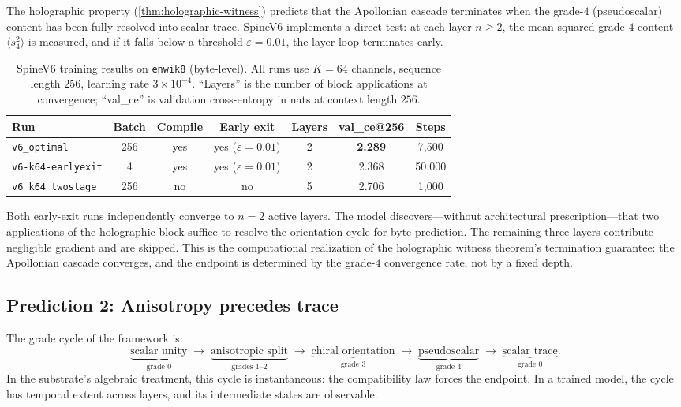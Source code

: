 \documentclass[11pt,a4paper]{article}
\theoremstyle{plain}
\theoremstyle{definition}
\theoremstyle{remark}
\numberwithin{equation}{section}
\begin{document}
The holographic property (\cref{thm:holographic-witness}) predicts
that the Apollonian cascade terminates when the grade-$4$
(pseudoscalar) content has been fully resolved into scalar trace.
SpineV6 implements a direct test: at each layer $n \ge 2$, the
mean squared grade-$4$ content $\langle s_4^2 \rangle$ is measured,
and if it falls below a threshold $\varepsilon = 0.01$, the layer
loop terminates early.

\begin{table}[ht]
\centering
\caption{SpineV6 training results on \texttt{enwik8} (byte-level).
All runs use $K = 64$ channels, sequence length $256$, learning
rate $3 \times 10^{-4}$.  ``Layers'' is the number of block
applications at convergence; ``val\_ce'' is validation
cross-entropy in nats at context length $256$.}
\label{tab:v6-results}
\renewcommand{\arraystretch}{1.3}
\small
\begin{tabular}{l c c c c c c}
\toprule
\textbf{Run} & \textbf{Batch} & \textbf{Compile} & \textbf{Early exit} & \textbf{Layers} & \textbf{val\_ce@256} & \textbf{Steps} \\
\midrule
\texttt{v6\_optimal}     & 256 & yes & yes ($\varepsilon = 0.01$) & 2 & \textbf{2.289} & 7{,}500 \\
\texttt{v6-k64-earlyexit}& 4  & yes & yes ($\varepsilon = 0.01$) & 2 & 2.368          & 50{,}000 \\
\texttt{v6\_k64\_twostage}& 256 & no & no                        & 5 & 2.706          & 1{,}000 \\
\bottomrule
\end{tabular}
\end{table}

Both early-exit runs independently converge to $n = 2$ active
layers.  The model discovers---without architectural
prescription---that two applications of the holographic block
suffice to resolve the orientation cycle for byte prediction.
The remaining three layers contribute negligible gradient and are
skipped.  This is the computational realization of the holographic
witness theorem's termination guarantee: the Apollonian cascade
converges, and the endpoint is determined by the grade-$4$
convergence rate, not by a fixed depth.

\subsection{Prediction 2: Anisotropy precedes trace}

The grade cycle of the framework is:
\[
  \underbrace{\text{scalar unity}}_{\text{grade 0}}
  \;\to\;
  \underbrace{\text{anisotropic split}}_{\text{grades 1--2}}
  \;\to\;
  \underbrace{\text{chiral orientation}}_{\text{grade 3}}
  \;\to\;
  \underbrace{\text{pseudoscalar}}_{\text{grade 4}}
  \;\to\;
  \underbrace{\text{scalar trace}}_{\text{grade 0}}.
\]
In the substrate's algebraic treatment, this cycle is instantaneous:
the compatibility law forces the endpoint.  In a trained model, the
cycle has temporal extent across layers, and its intermediate
states are observable.
\end{document}
